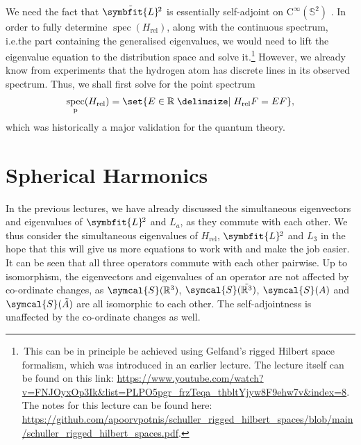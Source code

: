 \documentclass[12pt, a4 paper]{article}
\theoremstyle{definition}
\newcommand{\rthree}{\mathbb{R}^3}
\newcommand{\rr}{\mathbb{R}}
\newcommand{\schwartz}{\symcal{S}}
\newcommand{\schwartzrthree}{\schwartz(\rr^3)}
\DeclareMathOperator{\spec}{spec}
\newcommand{\lvecsquare}{\tilde{\symbfit{L}}\kern-1pt^2}
\begin{document}
	We need the fact that $\lvecsquare$ is essentially self-adjoint on $\mathrm{C}^\infty(\mathbb{S}^2)$ \cite{MorettiDomain}. In order to fully determine $\spec(H_\text{rel})$, along with the continuous spectrum, i.e.\@ the part containing the generalised eigenvalues, we would need to lift the eigenvalue equation to the distribution space and solve it.\footnote{\,This can be in principle be achieved using Gelfand's rigged Hilbert space formalism, which was introduced in an earlier lecture. The lecture itself can be found on this link: \url{https://www.youtube.com/watch?v=FNJOyxOp3Ik&list=PLPO5pgr_frzTeqa_thbltYjyw8F9ehw7v&index=8}. The notes for this lecture can be found here: \url{https://github.com/apoorvpotnis/schuller_rigged_hilbert_spaces/blob/main/schuller_rigged_hilbert_spaces.pdf}.} However, we already know from experiments that the hydrogen atom has discrete lines in its observed spectrum. Thus, we shall first solve for the point spectrum
	\[
		\spec_{\text{p}}(H_\text{rel}) = \set{E \in \rr \given H_\text{rel} F = E F},
	\]
	which was historically a major validation for the quantum theory.

	\section{Spherical Harmonics}

	In the previous lectures, we have already discussed the simultaneous eigenvectors and eigenvalues of $\symbfit{L}\kern-1pt^2$ and $L_a$, as they commute with each other. We thus consider the simultaneous eigenvalues of $H_\text{rel}$, $\symbfit{L}\kern-1pt^2$ and $L_3$ in the hope that this will give us more equations to work with and make the job easier. It can be seen that all three operators commute with each other pairwise. Up to isomorphism, the eigenvectors and eigenvalues of an operator are not affected by co-ordinate changes, as $\schwartzrthree$, $\schwartz(\tilde{\rthree})$, $\schwartz(A)$ and $\schwartz(\tilde{A})$ are all isomorphic to each other. The self-adjointness is unaffected by the co-ordinate changes as well.
\end{document}

